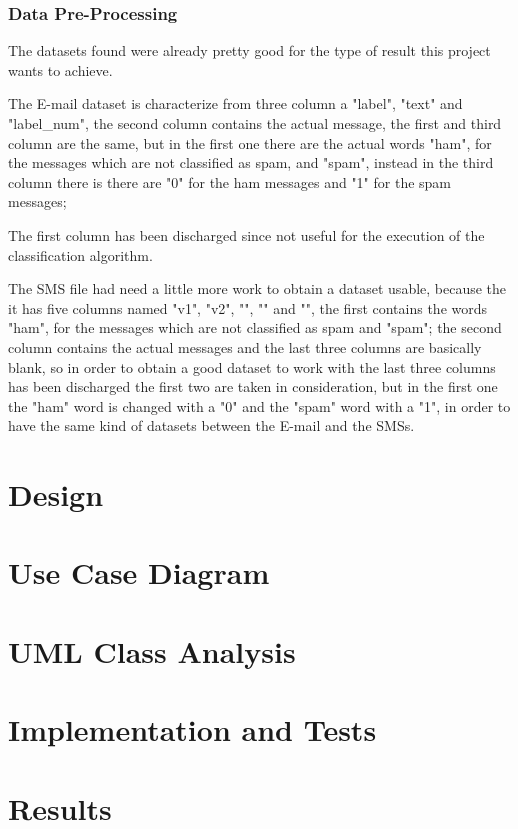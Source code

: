 \documentclass[a4paper]{report}
\begin{document}
\subsection{Data Pre-Processing}
The datasets found were already pretty good for the type of result this project wants to achieve.

\noindent The E-mail dataset is characterize from three column a "label", "text" and "label\_num", the second column contains the actual message, the first and third column are the same, but in the first one there are the actual words "ham", for the messages which are not classified as spam, and "spam",  instead in the third column there is there are "0" for the ham messages and "1" for the spam messages;

\noindent The first column has been discharged since not useful for the execution of the classification algorithm.

\noindent The SMS file had need a little more work to obtain a dataset usable, because the it has five columns named "v1", "v2", "", "" and "", the first contains the words "ham", for the messages which are not classified as spam and "spam"; the second column contains the actual messages and the last three columns are basically blank, so in order to obtain a good dataset to work with the last three columns has been discharged the first two are taken in consideration, but in the first one the "ham" word is changed with a "0" and the "spam" word with a "1", in order to have the same kind of datasets between the E-mail and the SMSs.
\chapter{Design}
\chapter{Use Case Diagram}
\chapter{UML Class Analysis}
\chapter{Implementation and Tests}
\chapter{Results}
\end{document}
